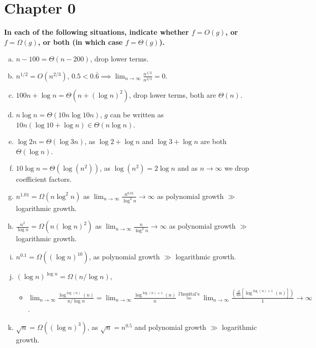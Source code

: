 \section{Chapter 0}
\begin{problem}{0.1}
    \textbf{In each of the following situations, indicate whether $f = O(g)$, or $f =\Omega(g)$, or both (in which case $f = \Theta(g)$).}
    
    \begin{enumerate}[(a)]
        \item $n-100=\Theta(n-200)$, drop lower terms.
        \item $n^{1/2}= O(n^{2/3})$, $0.5 < 0.\bar 6\implies\displaystyle\lim_{n\to\infty}\frac{n^{1/2}}{n^{2/3}}=0$.
        \item $100n+\log{n}=\Theta(n+(\log{n})^2)$, drop lower terms, both are $\Theta(n)$.
        \item $n\log n=\Theta(10n\log 10n)$, $g$ can be written as $10n(\log10+\log n)\in\Theta(n\log n)$.
        \item $\log 2n=\Theta(\log 3n)$, as $\log 2+\log n$ and $\log 3+\log n$ are both $\Theta(\log n)$.
        \item $10\log n=\Theta(\log(n^2))$, as $\log(n^2)=2\log n$ and as $n\to\infty$ we drop coefficient factors.
        \item $n^{1.01}=\Omega(n\log^2 n)$ as $\displaystyle\lim_{n\to\infty}\frac{n^{0.01}}{\log^2 n}\to\infty$ as polynomial growth $\gg$ logarithmic growth.
        \item $\frac{n^2}{\log n}=\Omega(n(\log n)^2)$ as $\displaystyle\lim_{n\to\infty}\frac{n}{\log^2 n}\to\infty$ as polynomial growth $\gg$ logarithmic growth.
        \item $n^{0.1}=\Omega((\log n)^{10})$, as polynomial growth $\gg$ logarithmic growth.
        \item $(\log n)^{\log n}=\Omega(n/\log n)$, 
            \begin{itemize}
                \item $\displaystyle\lim_{n\to\infty} \frac{\log^{\log(n)}(n)}{n/\log{n}}
                =\lim_{n\to\infty} \frac{\log^{\log(n)+1}(n)}{n}
                \stackrel{\text{l'hopital's}}{=}\lim_{n\to\infty}\frac{\left(\frac{\mathrm d}{\mathrm{d}n}\left[\log^{\log(n)+1}(n)\right]\right)}{1}
                \to\infty$.
            \end{itemize}
        \item $\sqrt n=\Omega((\log n)^3)$, as $\sqrt n=n^{0.5}$ and polynomial growth $\gg$ logarithmic growth.

\end{enumerate}
\end{problem}
